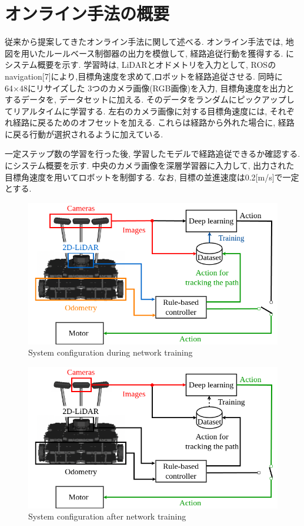 
\section{オンライン手法の概要}
従来から提案してきたオンライン手法に関して述べる. オンライン手法では, 地図を用いたルールベース制御器の出力を模倣して, 経路追従行動を獲得する. にシステム概要を示す. 学習時は, LiDARとオドメトリを入力として, ROSのnavigation[7]により,目標角速度を求めて,ロボットを経路追従させる. 同時に64×48にリサイズした 3つのカメラ画像(RGB画像)を入力, 目標角速度を出力とするデータを, データセットに加える. そのデータをランダムにピックアップしてリアルタイムに学習する. 左右のカメラ画像に対する目標角速度には, それぞれ経路に戻るためのオフセットを加える. これらは経路から外れた場合に, 経路に戻る行動が選択されるように加えている. \par 一定ステップ数の学習を行った後, 学習したモデルで経路追従できるか確認する. にシステム概要を示す. 中央のカメラ画像を深層学習器に入力して, 出力された目標角速度を用いてロボットを制御する. なお, 目標の並進速度は0.2[m/s]で一定とする.

\newpage
\begin{figure}[h]
  \centering
  \includegraphics[keepaspectratio, scale=0.45]{images/si2021-okada.png}
  \caption{System configuration during network training}
  \label{Fig:learning}
  \end{figure}

\begin{figure}[h]
  \centering
  \includegraphics[keepaspectratio, scale=0.45]{images/si2021-okada-test.png}
  \caption{System configuration after network training}
  \label{Fig:test}
  \end{figure}

